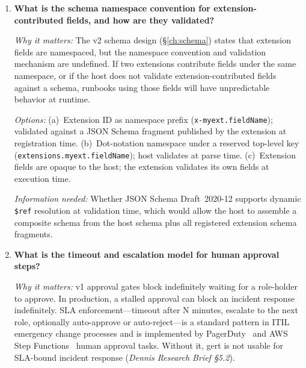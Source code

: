 \begin{enumerate}[label=\textbf{Q\arabic*.}]
    \textit{Information needed:} Industry precedent from Temporal (compensation activities run in
    the same workflow context) and AWS Step Functions~\cite{aws-step-functions} (catch/retry blocks have no separate IAM
    policy). A decision here feeds into \S\ref{ch:schema} (compensation field design) and
    \S\ref{ch:security} (governance scope).

  \item \textbf{What is the schema namespace convention for extension-contributed fields, and how are
    they validated?}

    \textit{Why it matters:} The v2 schema design (\S\ref{ch:schema}) states that extension fields
    are namespaced, but the namespace convention and validation mechanism are undefined. If two
    extensions contribute fields under the same namespace, or if the host does not validate
    extension-contributed fields against a schema, runbooks using those fields will have
    unpredictable behavior at runtime.

    \textit{Options:} (a)~Extension ID as namespace prefix (\texttt{x-myext.fieldName}); validated
    against a JSON Schema fragment published by the extension at registration time. (b)~Dot-notation
    namespace under a reserved top-level key (\texttt{extensions.myext.fieldName}); host validates
    at parse time. (c)~Extension fields are opaque to the host; the extension validates its own
    fields at execution time.

    \textit{Information needed:} Whether JSON Schema Draft~2020-12 supports dynamic
    \texttt{\$ref} resolution at validation time, which would allow the host to assemble a composite
    schema from the host schema plus all registered extension schema fragments.

  \item \textbf{What is the timeout and escalation model for human approval steps?}

    \textit{Why it matters:} v1 approval gates block indefinitely waiting for a role-holder to
    approve. In production, a stalled approval can block an incident response indefinitely. SLA
    enforcement---timeout after N minutes, escalate to the next role, optionally auto-approve or
    auto-reject---is a standard pattern in ITIL emergency change processes and is implemented by
    PagerDuty~\cite{pagerduty-automation} and AWS Step Functions~\cite{aws-step-functions} human approval tasks. Without it, gert is not usable for SLA-bound
    incident response (\textit{Dennis Research Brief \S5.2}).


\end{enumerate}
